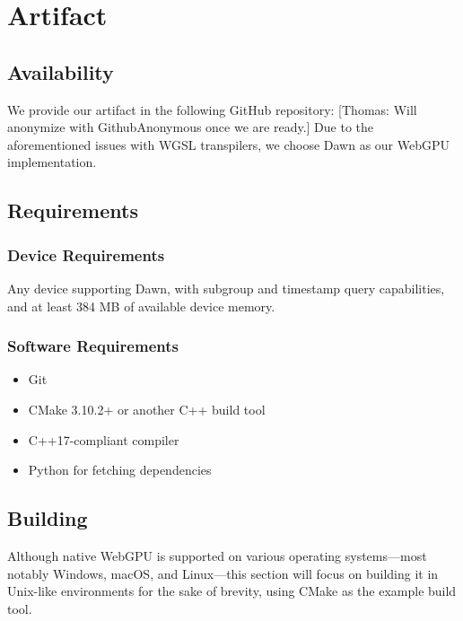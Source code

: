 \documentclass[sigconf]{acmart}
\newcommand{\thomas}[1]{{\footnotesize\color{orange}[Thomas: #1]}}
\begin{document}



\appendix
\section{Artifact}

\subsection{Availability}
We provide our artifact in the following GitHub repository:
\thomas{Will anonymize with GithubAnonymous once we are ready.}
Due to the aforementioned issues with WGSL transpilers, we choose Dawn as our WebGPU implementation.

\subsection{Requirements}

\subsubsection{Device Requirements}
Any device supporting Dawn, with subgroup and timestamp query capabilities, and at least 384 MB of available device memory.

\subsubsection{Software Requirements}
\begin{itemize}
  \item Git
  \item CMake 3.10.2+ or another C++ build tool
  \item C++17-compliant compiler
  \item Python for fetching dependencies
\end{itemize}

\subsection{Building}
Although native WebGPU is supported on various operating systems—most notably Windows, macOS, and Linux—this section will focus on building it in Unix-like environments for the sake of brevity, using CMake as the example build tool.
\end{document}
